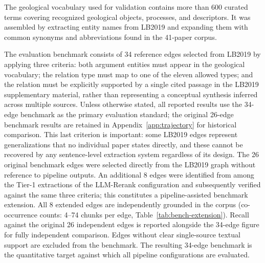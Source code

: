 \documentclass[10pt]{article}
\begin{document}
The geological vocabulary used for validation contains more
than 600 curated terms covering recognized geological objects,
processes, and descriptors.
It was assembled by extracting entity names from LB2019 and
expanding them with common synonyms and abbreviations found
in the 41-paper corpus.

The evaluation benchmark consists of 34 reference edges
selected from LB2019 by applying three criteria: both argument
entities must appear in the geological vocabulary; the relation
type must map to one of the eleven allowed types; and the
relation must be explicitly supported by a single cited passage
in the LB2019 supplementary material, rather than representing
a conceptual synthesis inferred across multiple sources.
Unless otherwise stated, all reported results use the 34-edge benchmark as the primary evaluation standard; the original 26-edge benchmark results are retained in Appendix~\ref{app:trajectory} for historical comparison.
This last criterion is important: some LB2019 edges represent
generalizations that no individual paper states directly, and
these cannot be recovered by any sentence-level extraction
system regardless of its design.
The 26 original benchmark edges were selected directly from the LB2019 graph without reference to pipeline outputs. An additional 8 edges were identified from among the Tier-1 extractions of the LLM-Rerank configuration and subsequently verified against the same three criteria; this constitutes a pipeline-assisted benchmark extension. All 8 extended edges are independently grounded in the corpus (co-occurrence counts: 4--74 chunks per edge, Table~\ref{tab:bench-extension}). Recall against the original 26 independent edges is reported alongside the 34-edge figure for fully independent comparison.
Edges without clear single-source textual support are excluded
from the benchmark.
The resulting 34-edge benchmark is the quantitative target
against which all pipeline configurations are evaluated.
\end{document}
